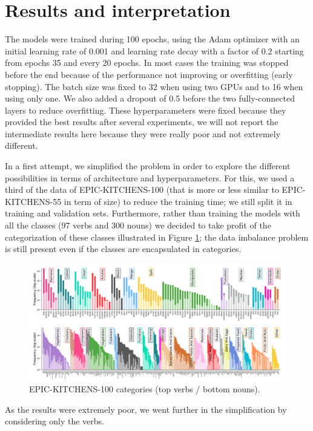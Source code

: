 \documentclass[12pt, a4paper]{report}
\begin{document}
		\section{Results and interpretation}\label{results}
			The models were trained during 100 epochs, using the Adam optimizer with an initial learning rate of 0.001 and learning rate decay with a factor of 0.2 starting from epochs 35 and every 20 epochs.
			In most cases the training was stopped before the end because of the performance not improving or overfitting (early stopping).
			The batch size was fixed to 32 when using two GPUs and to 16 when using only one.
			We also added a dropout of 0.5 before the two fully-connected layers to reduce overfitting.
			These hyperparameters were fixed because they provided the best results after several experiments, we will not report the intermediate results here because they were really poor and not extremely different.
			\par
			In a first attempt, we simplified the problem in order to explore the different possibilities in terms of architecture and hyperparameters.
			For this, we used a third of the data of EPIC-KITCHENS-100 (that is more or less similar to EPIC-KITCHENS-55 in term of size) to reduce the training time; we still split it in training and validation sets.
			Furthermore, rather than training the models with all the classes (97 verbs and 300 nouns) we decided to take profit of the categorization of these classes illustrated in Figure \ref{categories}; the data imbalance problem is still present even if the classes are encapsulated in categories.
			\begin{figure}[h!]
				\centering
				\includegraphics[width=1.1\textwidth]{EPIC-100 data imbalance.png}
				\caption{EPIC-KITCHENS-100 categories (top verbs / bottom nouns).}
				\label{categories}
			\end{figure}
			As the results were extremely poor, we went further in the simplification by considering only the verbs.
\end{document}
